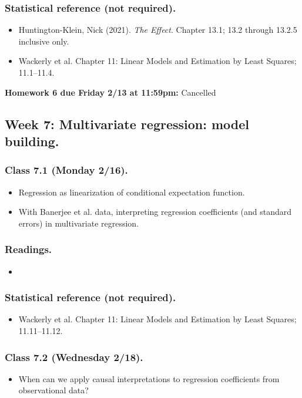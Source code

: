 \documentclass[letterpaper, 12pt, parskip=full,DIV=10]{scrartcl}
\begin{document}
\subsubsection*{Statistical reference (not required).}
\begin{itemize}
\item Huntington-Klein, Nick (2021). \textit{The Effect}. Chapter 13.1; 13.2 through 13.2.5 inclusive only.
\item Wackerly et al. Chapter 11: Linear Models and Estimation by Least Squares; 11.1--11.4.
\end{itemize}

\textbf{Homework 6 due Friday 2/13 at 11:59pm:}
Cancelled

\subsection*{Week 7: Multivariate regression: model building.}
\subsubsection*{Class 7.1 (Monday 2/16).}
\begin{itemize}
\item Regression as linearization of conditional expectation function.
\item With Banerjee et al. data, interpreting regression coefficients (and standard errors) in multivariate regression.
\end{itemize}

\subsubsection*{Readings.}
\begin{itemize}
\item {}
\end{itemize}

\subsubsection*{Statistical reference (not required).}
\begin{itemize}
\item Wackerly et al. Chapter 11: Linear Models and Estimation by Least Squares; 11.11--11.12.
\end{itemize}

\subsubsection*{Class 7.2 (Wednesday 2/18).}
\begin{itemize}
\item When can we apply causal interpretations to regression coefficients from observational data?
\end{itemize}
\end{document}

